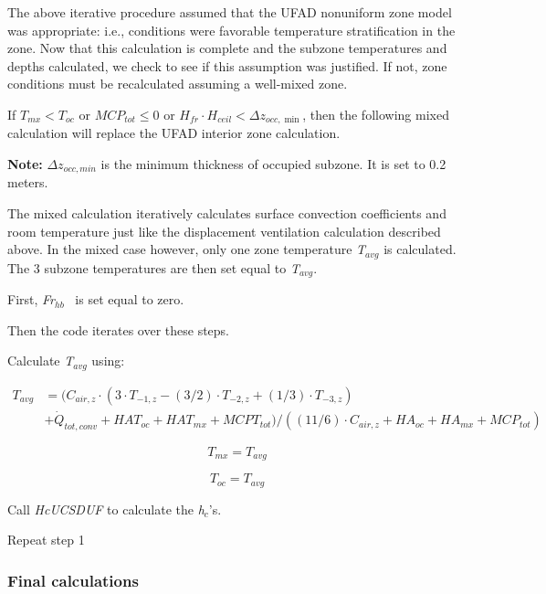 {The above iterative procedure assumed that the UFAD nonuniform zone model was appropriate: i.e., conditions were favorable temperature stratification in the zone. Now that this calculation is complete and the subzone temperatures and depths calculated, we check to see if this assumption was justified. If not, zone conditions must be recalculated assuming a well-mixed zone.

If \({T_{mx}} < {T_{oc}}\) or \(MC{P_{tot}} \le 0\) or \({H_{fr}} \cdot {H_{ceil}} < \Delta {z_{occ,\min }}\), then the following mixed calculation will replace the UFAD interior zone calculation.

\textbf{Note:} \(\Delta {z_{occ,min}}\) is the minimum thickness of occupied subzone. It is set to 0.2 meters.

The mixed calculation iteratively calculates surface convection coefficients and room temperature just like the displacement ventilation calculation described above. In the mixed case however, only one zone temperature \emph{T\(_{avg}\)} is calculated. The 3 subzone temperatures are then set equal to \emph{T\(_{avg}\)}.

First, \emph{Fr\(_{hb}\)}~ is set equal to zero.

Then the code iterates over these steps.

Calculate \emph{T\(_{avg}\)} using:

\begin{equation}
  \begin{array}{rl}
    T_{avg} &= ({C_{air,z}} \cdot (3 \cdot {T_{ - 1,z}} - (3/2) \cdot {T_{ - 2,z}} + (1/3) \cdot {T_{ - 3,z}}) \\
            &+ {{\dot Q}_{tot,conv}} + HA{T_{oc}} + HA{T_{mx}} + MCP{T_{tot}})/((11/6) \cdot {C_{air,z}} + H{A_{oc}} + H{A_{mx}} + MC{P_{tot}})
  \end{array}
\end{equation}

\begin{equation}
{T_{mx}} = {T_{avg}}
\end{equation}

\begin{equation}
{T_{oc}} = {T_{avg}}
\end{equation}

Call \emph{HcUCSDUF} to calculate the \emph{h\(_{c}\)}'s.

Repeat step 1

\subsubsection{Final calculations}\label{final-calculations-1}

}
